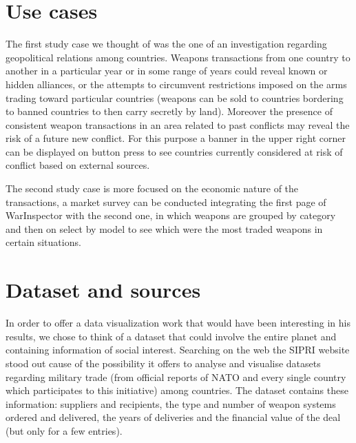\documentclass{article}
\begin{document}
\begin{multicols}{2}
\section{Use cases}
The first study case we thought of was the one of an investigation regarding geopolitical relations among countries. Weapons transactions from one country to another in a particular year or in some range of years could reveal  known or hidden alliances, or the attempts to circumvent restrictions imposed on the arms trading toward particular countries (weapons can be sold to countries bordering to banned countries to then carry secretly by land). Moreover the presence of consistent weapon transactions in an area related to past conflicts may reveal the risk of a future new conflict. For this purpose a banner in the upper right corner can be displayed on button press to see countries currently considered at risk of conflict based on external sources.

The second study case is more focused on the economic nature of the transactions, a market survey can be conducted integrating the first page of WarInspector with the second one, in which weapons are grouped by category and then on select by model to see which were the most traded weapons in certain situations. 



\section{Dataset and sources}
%


In order to offer a data visualization work that would have been interesting in his results, we chose to think of a dataset that could involve the entire planet and containing  information of social interest. Searching on the web the SIPRI website stood out cause of the possibility it offers to analyse and visualise datasets regarding military trade (from official reports of NATO and every single country which participates to this initiative) among countries. The dataset contains these information: suppliers and recipients, the type and number of weapon systems ordered and delivered, the years of deliveries and the financial value of the deal (but only for a few entries). 


\end{multicols}
\end{document}
